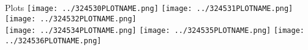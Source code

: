 \begin{frame}
\begin{block}{Plots}
                \texttt{[image: ../324530PLOTNAME.png]}
                \texttt{[image: ../324531PLOTNAME.png]}
                \texttt{[image: ../324532PLOTNAME.png]}\\
                \texttt{[image: ../324534PLOTNAME.png]}
                \texttt{[image: ../324535PLOTNAME.png]}
                \texttt{[image: ../324536PLOTNAME.png]}

        \end{block}
\end{frame}
